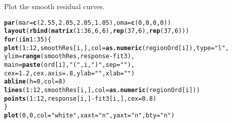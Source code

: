 \documentclass{article}\usepackage[]{graphicx}\usepackage[]{color}
\makeatletter
\newcommand{\hlnum}[1]{\textcolor[rgb]{0.686,0.059,0.569}{#1}}%
\newcommand{\hlstr}[1]{\textcolor[rgb]{0.192,0.494,0.8}{#1}}%
\newcommand{\hlopt}[1]{\textcolor[rgb]{0,0,0}{#1}}%
\newcommand{\hlstd}[1]{\textcolor[rgb]{0.345,0.345,0.345}{#1}}%
\newcommand{\hlkwa}[1]{\textcolor[rgb]{0.161,0.373,0.58}{\textbf{#1}}}%
\newcommand{\hlkwc}[1]{\textcolor[rgb]{0.333,0.667,0.333}{#1}}%
\newcommand{\hlkwd}[1]{\textcolor[rgb]{0.737,0.353,0.396}{\textbf{#1}}}%
\newenvironment{kframe}{%
 \def\at@end@of@kframe{}%
 \ifinner\ifhmode%
  \def\at@end@of@kframe{\end{minipage}}%
  \begin{minipage}{\columnwidth}%
 \fi\fi%
 \def\FrameCommand##1{\hskip\@totalleftmargin \hskip-\fboxsep
 \colorbox{shadecolor}{##1}\hskip-\fboxsep
     \hskip-\linewidth \hskip-\@totalleftmargin \hskip\columnwidth}%
 \MakeFramed {\advance\hsize-\width
   \@totalleftmargin\z@ \linewidth\hsize
   \@setminipage}}%
 {\par\unskip\endMakeFramed%
 \at@end@of@kframe}
\newenvironment{knitrout}{}{} %
\makeatother
\begin{document}
Plot the smooth residual curves.
\begin{knitrout}
\color{fgcolor}\begin{kframe}
\begin{alltt}
\hlkwd{par}\hlstd{(}\hlkwc{mar} \hlstd{=} \hlkwd{c}\hlstd{(}\hlnum{2.55}\hlstd{,} \hlnum{2.05}\hlstd{,} \hlnum{2.05}\hlstd{,} \hlnum{1.05}\hlstd{),} \hlkwc{oma}\hlstd{=}\hlkwd{c}\hlstd{(}\hlnum{0}\hlstd{,} \hlnum{0}\hlstd{,} \hlnum{0}\hlstd{,} \hlnum{0}\hlstd{))}
\hlkwd{layout}\hlstd{(}\hlkwd{rbind}\hlstd{(}\hlkwd{matrix}\hlstd{(}\hlnum{1}\hlopt{:}\hlnum{36}\hlstd{,} \hlnum{6}\hlstd{,} \hlnum{6}\hlstd{),} \hlkwd{rep}\hlstd{(}\hlnum{37}\hlstd{,} \hlnum{6}\hlstd{),} \hlkwd{rep}\hlstd{(}\hlnum{37}\hlstd{,} \hlnum{6}\hlstd{)))}
\hlkwa{for}\hlstd{(i} \hlkwa{in} \hlnum{1}\hlopt{:}\hlnum{35}\hlstd{) \{}
  \hlkwd{plot}\hlstd{(}\hlnum{1}\hlopt{:}\hlnum{12}\hlstd{, smoothRes[i, ],} \hlkwc{col} \hlstd{=} \hlkwd{as.numeric}\hlstd{(regionOrd[i]),} \hlkwc{type} \hlstd{=} \hlstr{"l"}\hlstd{,}
       \hlkwc{ylim} \hlstd{=} \hlkwd{range}\hlstd{(smoothRes, response}\hlopt{-}\hlstd{fit3),}
       \hlkwc{main} \hlstd{=} \hlkwd{paste}\hlstd{(ord[i],} \hlstr{" ("}\hlstd{, i,} \hlstr{")"}\hlstd{,} \hlkwc{sep} \hlstd{=} \hlstr{""}\hlstd{),}
       \hlkwc{cex} \hlstd{=} \hlnum{1.2}\hlstd{,} \hlkwc{cex.axis} \hlstd{=} \hlnum{.8}\hlstd{,} \hlkwc{ylab} \hlstd{=} \hlstr{""}\hlstd{,} \hlkwc{xlab} \hlstd{=} \hlstr{""}\hlstd{)}
  \hlkwd{abline}\hlstd{(}\hlkwc{h} \hlstd{=} \hlnum{0}\hlstd{,} \hlkwc{col} \hlstd{=} \hlnum{8}\hlstd{)}
  \hlkwd{lines}\hlstd{(}\hlnum{1}\hlopt{:}\hlnum{12}\hlstd{, smoothRes[i, ],} \hlkwc{col} \hlstd{=} \hlkwd{as.numeric}\hlstd{(regionOrd[i]))}
  \hlkwd{points}\hlstd{(}\hlnum{1}\hlopt{:}\hlnum{12}\hlstd{, response[i, ]} \hlopt{-} \hlstd{fit3[i, ],} \hlkwc{cex} \hlstd{=} \hlnum{0.8}\hlstd{)}
\hlstd{\}}
\hlkwd{plot}\hlstd{(}\hlnum{0}\hlstd{,} \hlnum{0}\hlstd{,} \hlkwc{col} \hlstd{=} \hlstr{"white"}\hlstd{,} \hlkwc{xaxt} \hlstd{=} \hlstr{"n"}\hlstd{,} \hlkwc{yaxt} \hlstd{=} \hlstr{"n"}\hlstd{,} \hlkwc{bty} \hlstd{=} \hlstr{"n"}\hlstd{)}


\end{alltt}
\end{kframe}
\end{knitrout}
\end{document}
